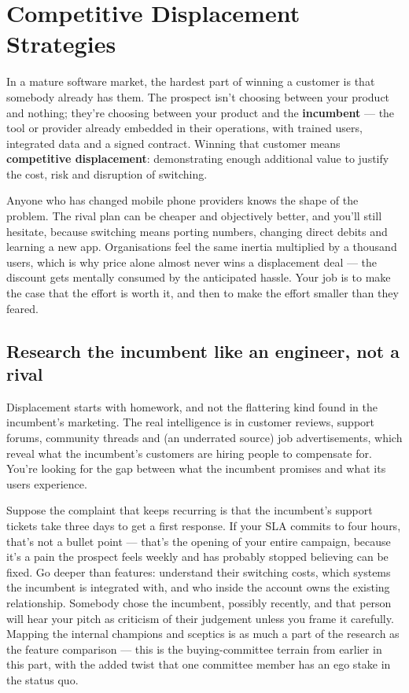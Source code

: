 \section{Competitive Displacement Strategies}
In a mature software market, the hardest part of winning a customer is that somebody already has them. The prospect isn't choosing between your product and nothing; they're choosing between your product and the \textbf{incumbent} — the tool or provider already embedded in their operations, with trained users, integrated data and a signed contract. Winning that customer means \textbf{competitive displacement}: demonstrating enough additional value to justify the cost, risk and disruption of switching.


Anyone who has changed mobile phone providers knows the shape of the problem. The rival plan can be cheaper and objectively better, and you'll still hesitate, because switching means porting numbers, changing direct debits and learning a new app. Organisations feel the same inertia multiplied by a thousand users, which is why price alone almost never wins a displacement deal — the discount gets mentally consumed by the anticipated hassle. Your job is to make the case that the effort is worth it, and then to make the effort smaller than they feared.



\subsection{Research the incumbent like an engineer, not a rival}


Displacement starts with homework, and not the flattering kind found in the incumbent's marketing. The real intelligence is in customer reviews, support forums, community threads and (an underrated source) job advertisements, which reveal what the incumbent's customers are hiring people to compensate for. You're looking for the gap between what the incumbent promises and what its users experience.


Suppose the complaint that keeps recurring is that the incumbent's support tickets take three days to get a first response. If your SLA commits to four hours, that's not a bullet point — that's the opening of your entire campaign, because it's a pain the prospect feels weekly and has probably stopped believing can be fixed. Go deeper than features: understand their switching costs, which systems the incumbent is integrated with, and who inside the account owns the existing relationship. Somebody chose the incumbent, possibly recently, and that person will hear your pitch as criticism of their judgement unless you frame it carefully. Mapping the internal champions and sceptics is as much a part of the research as the feature comparison — this is the buying-committee terrain from earlier in this part, with the added twist that one committee member has an ego stake in the status quo.


